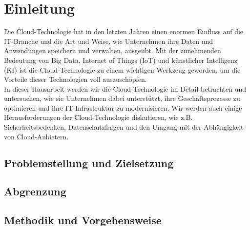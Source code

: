 \newpage
\section{Einleitung}
Die Cloud-Technologie hat in den letzten Jahren einen enormen Einfluss auf die IT-Branche und die Art und Weise, wie Unternehmen ihre Daten und Anwendungen speichern und verwalten, ausgeübt. Mit der zunehmenden Bedeutung von Big Data, Internet of Things (IoT) und künstlicher Intelligenz (KI) ist die Cloud-Technologie zu einem wichtigen Werkzeug geworden, um die Vorteile dieser Technologien voll auszuschöpfen.\\

In dieser Hausarbeit werden wir die Cloud-Technologie im Detail betrachten und untersuchen, wie sie Unternehmen dabei unterstützt, ihre Geschäftsprozesse zu optimieren und ihre IT-Infrastruktur zu modernisieren. Wir werden auch einige Herausforderungen der Cloud-Technologie diskutieren, wie z.B. Sicherheitsbedenken, Datenschutzfragen und den Umgang mit der Abhängigkeit von Cloud-Anbietern.
\subsection{Problemstellung und Zielsetzung}
\subsection{Abgrenzung}
\subsection{Methodik und Vorgehensweise}